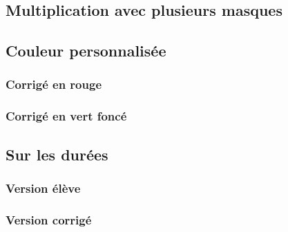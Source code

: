 \documentclass[11pt,a4paper]{article}
\begin{document}
\begin{center}
\end{center}

\subsection{Multiplication avec plusieurs masques}

\begin{center}
\end{center}

\subsection{Couleur personnalisée}

\subsubsection{Corrigé en rouge}

\begin{center}
\end{center}

\subsubsection{Corrigé en vert foncé}

\begin{center}
\end{center}

\subsection{Sur les durées}

\subsubsection{Version élève}

\begin{center}
\end{center}

\subsubsection{Version corrigé}
\end{document}

